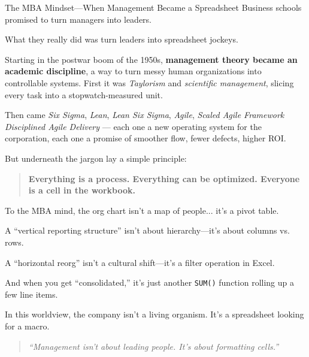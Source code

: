 \begin{HistoricalSidebar}{The MBA Mindset—When Management Became a Spreadsheet}
    Business schools promised to turn managers into leaders.  

    \medskip

    What they really did was turn leaders into spreadsheet jockeys.

    \medskip
    
    Starting in the postwar boom of the 1950s, \textbf{management theory became an academic discipline}, a way to turn messy human organizations into controllable systems. First it was \textit{Taylorism} and \textit{scientific management}, slicing every task into a stopwatch-measured unit. 

    \medskip
    
    Then came \textit{Six Sigma}, \textit{Lean}, \textit{Lean Six Sigma}, \textit{Agile}, \textit{Scaled Agile Framework} \textit{Disciplined Agile Delivery} --- each one a new operating system for the corporation, each one a promise of smoother flow, fewer defects, higher ROI.

    \medskip
    
    But underneath the jargon lay a simple principle:  

    \begin{quote}
    \textbf{Everything is a process. Everything can be optimized. Everyone is a cell in the workbook.}
    \end{quote}
    
    To the MBA mind, the org chart isn’t a map of people...  it’s a pivot table.  

    \medskip
    
    A “vertical reporting structure” isn’t about hierarchy—it’s about columns vs. rows.  

    \medskip

    A “horizontal reorg” isn’t a cultural shift—it’s a filter operation in Excel.  

    \medskip

    And when you get “consolidated,” it’s just another \texttt{SUM()} function rolling up a few line items.

    \medskip
    
    In this worldview, the company isn’t a living organism.  It’s a spreadsheet looking for a macro.
    
    \begin{quote}
    \textit{“Management isn’t about leading people. It’s about formatting cells.”}
    \end{quote}
\end{HistoricalSidebar}

